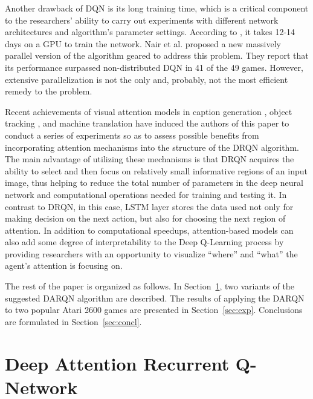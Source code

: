 \documentclass{article} \usepackage{nips15submit_e,times}
\begin{document}
Another drawback of DQN is its long training time, which is a critical component to the researchers' ability to carry out experiments 
with different network architectures and algorithm's parameter settings. According to \cite{mnih2015human}, it takes 12-14 days on a GPU 
to train the network. Nair et al. \cite{nair2015massively} proposed a new massively parallel version of the algorithm geared to address 
this problem. They report that its performance surpassed non-distributed DQN in 41 of the 49 games. However, extensive parallelization is 
not the only and, probably, not the most efficient remedy to the problem.

Recent achievements of visual attention models in caption generation \cite{xu2015show}, object tracking \cite{denil2012learning, mnih2014ram},
and machine translation \cite{bahdanau2014neural} have induced the authors of this paper to conduct a series of experiments so as to assess
possible benefits from incorporating attention mechanisms into the structure of the DRQN algorithm. The main advantage of utilizing these
mechanisms is that DRQN acquires the ability to select and then focus on relatively small informative regions of an input image, thus helping to
reduce the total number of parameters in the deep neural network and computational operations needed for training and testing it. In contrast to
DRQN, in this case, LSTM layer stores the data used not only for making decision on the next action, but also for choosing the next
region of attention. In addition to computational speedups, attention-based models can also add some degree of interpretability to the Deep Q-Learning process by providing
researchers with an opportunity to visualize ``where'' and ``what'' the agent's attention is focusing on.

The rest of the paper is organized as follows. In Section~\ref{sec:model}, two variants of the suggested DARQN algorithm are described. 
The results of applying the DARQN to two popular Atari 2600 games are presented in Section~\ref{sec:exp}. Conclusions are formulated in 
Section~\ref{sec:concl}.

\section{Deep Attention Recurrent Q-Network}
\label{sec:model}
\end{document}
